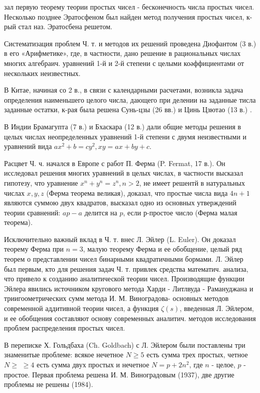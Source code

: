\documentclass[10pt]{article}
\begin{document}
зал первую теорему теории простых чисел - бесконечность числа простых чисел. Несколько позднее Эратосфеном был найден метод получения простых чисел, к-рый стал наз. Эратосбена решетом.



Систематизация проблем Ч. т. и методов их решений проведена Диофантом (3 в.) в его «Арифметике», где, в частности, дано решение в рациональных числах многих алгебраич. уравнений 1-й и 2-й степени с целыми коәффициентами от нескольких неизвестных.



В Китае, начиная со 2 в., в связи с календарными расчетами, возникла задача определения наименьшего целого числа, дающего при делении на заданные тисла заданные остатки, к-рая была решена Сунь-цзы (26 вв.) и Цинь Цзютао (13 в.) .



В Индии Брамагупта (7 в.) и Бхаскара (12 в.) дали общие методы решения в целых числах неопределенных уравнений 1-й степени с двумя неизвестными и уравнений вида $a x^{2}+b=c y^{2}, x y=a x+b y+c$.



Расцвет Ч. ч. начался в Европе с работ П. Ферма (P. Fermat, 17 в.). Он исследовал решения многих уравнений в целых числах, в частности высказал гипотезу, что уравнение $x^{n}+y^{n}=z^{n}, n>2$, не имеет решентй в натуральных числах $x, y, z$ (Ферма теорема великая), доказал, что простые числа вида $4 n+1$ являются суммою двух квадратов, высказал одно из основных утверждений теории сравнений: $a p-a$ делится на $p$, если р-простое число (Ферма малая теорема).



Исключительно важный вклад в Ч. т. внес Л. Эйлер (L. Euler). Он доказал теорему Ферма при $n=3$, малую теорему Ферма и ее обобщение, целый ряд теорем о представлении чисел бинарными квадратичными бормами. Л. Эйлер был первым, кто для решения задач Ч. т. привлек средства математич. анализа, что привело к созданию аналитической теории чисел. Производящие функции Эйлера явились источником кругового метода Харди - Литлвуда - Рамануджана и триигоометрических сумм метода И. М. Виноградова- основных методов современной аддитивной теории чисел, а функция $\zeta(s)$, введенная Л. Эйлером, и ее обобщения составляют основу современных аналитич. методов исследования проблем распределения простых чисел.



В переписке Х. Гольдбаха (Ch. Goldbach) с Л. Эйлером были поставлены три знаменитые проблеме: всякое нечетное $N \geqslant 5$ есть сумма трех простых, четное $N \geqslant$ $\geqslant 4$ есть сумма двух простых и нечетное $N=p+2 n^{2}$, где $n$ - целое, $p$ - простое. Первая проблема решена И. М. Виноградовым (1937), две другие проблемы не решены (1984).
\end{document}
